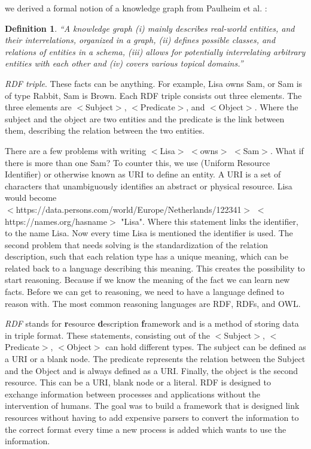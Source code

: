 \documentclass[11pt,letterpaper ,oneside ]{book}
\newtheorem{definition}{Definition}
\begin{document}
	we derived a formal notion of a knowledge graph from Paulheim et al. \cite{HeikoP:2016}:
	\begin{definition} 
		“A knowledge graph (i) mainly describes real-world entities, and their interrelations, organized in a graph, (ii) defines possible classes, and relations of entities in a schema, (iii) allows for potentially interrelating arbitrary entities with each other and (iv) covers various topical domains.”
	\end{definition}
	
	\textit{RDF triple}. These facts can be anything. For example, Lisa owns Sam, or Sam is of type Rabbit, Sam is Brown. Each RDF triple consists out three elements.
	The three elements are $<$Subject$>$, $<$Predicate$>$, and $<$Object$>$. Where the subject and the object are two entities and the predicate is the link between them, describing the relation between the two entities. 
	
	There are a few problems with writing $<$Lisa$>$ $<$owns$>$ $<$Sam$>$. What if there is more than one Sam? To counter this, we use (Uniform Resource Identifier) or otherwise known as URI to define an entity. A URI is a set of characters that unambiguously identifies an abstract or physical resource. Lisa would become \\$<$https://data.persons.com/world/Europe/Netherlands/122341$>$ $<$https://names.org/hasname$>$ "Lisa". Where this statement links the identifier, to the name Lisa. Now every time Lisa is mentioned the identifier is used. 
	The second problem that needs solving is the standardization of the relation description, such that each relation type has a unique meaning, which can be related back to a language describing this meaning. This creates the possibility to start reasoning. Because if we know the meaning of the fact we can learn new facts. Before we can get to reasoning, we need to have a language defined to reason with. The most common reasoning languages are RDF, RDFs, and OWL.
	
	\textit{RDF} \cite{rdfPrimer:2014} stands for \textbf{r}esource \textbf{d}escription \textbf{f}ramework and is a method of storing data in triple format. These statements, consisting out of the $<$Subject$>$, $<$Predicate$>$, $<$Object$>$ can hold different types. The subject can be defined as a URI or a blank node. The predicate represents the relation between the Subject and the Object and is always defined as a URI. Finally, the object is the second resource. This can be a URI, blank node or a literal.
	RDF is designed to exchange information between processes and applications without the intervention of humans. The goal was to build a framework that is designed link resources without having to add expensive parsers to convert the information to the correct format every time a new process is added which wants to use the information.\\
\end{document}
